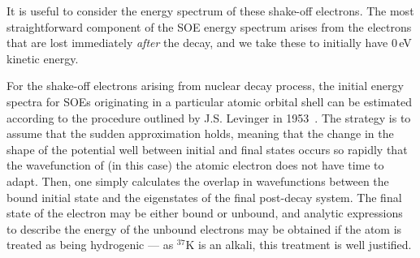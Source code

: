 It is useful to consider the energy spectrum of these shake-off electrons.  The most straightforward component of the SOE energy spectrum arises from the electrons that are lost immediately \emph{after} the decay, and we take these to initially have 0\,eV kinetic energy.  

For the shake-off electrons arising from nuclear decay process, the initial energy spectra for SOEs originating in a particular atomic orbital shell can be estimated according to the procedure outlined by J.S. Levinger in 1953~\cite{Levinger}.
%
The strategy is to assume that the sudden approximation holds, meaning that the change in the shape of the potential well between initial and final states occurs so rapidly that the wavefunction of (in this case) the atomic electron does not have time to adapt.  Then, one simply calculates the overlap in wavefunctions between the bound initial state and the eigenstates of the final post-decay system.  The final state of the electron may be either bound or unbound, and analytic expressions to describe the energy of the unbound electrons may be obtained if the atom is treated as being hydrogenic --- as $^{37}\textrm{K}$ is an alkali, this treatment is well justified.
 
%


